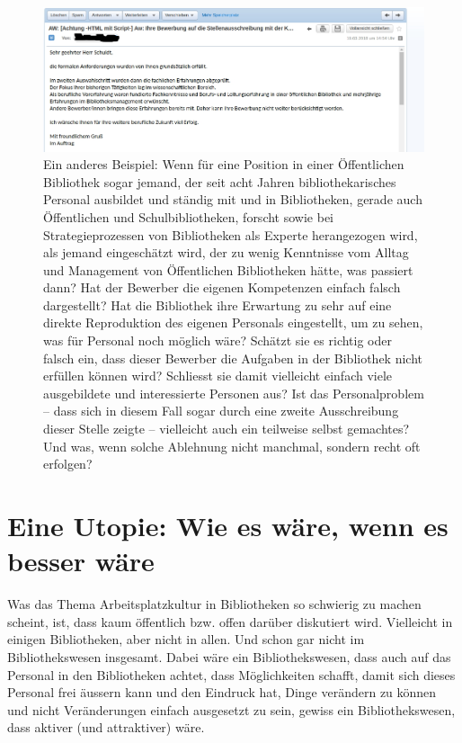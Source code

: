\documentclass[a4paper,
fontsize=11pt,
oneside,
numbers=noperiodatend,
parskip=half-,
bibliography=totoc,
final
]{scrartcl}
\begin{document}
\begin{figure}
\centering
\includegraphics{img/image_2.jpg}
\caption{Ein anderes Beispiel: Wenn für eine Position in einer
Öffentlichen Bibliothek sogar jemand, der seit acht Jahren
bibliothekarisches Personal ausbildet und ständig mit und in
Bibliotheken, gerade auch Öffentlichen und Schulbibliotheken, forscht
sowie bei Strategieprozessen von Bibliotheken als Experte herangezogen
wird, als jemand eingeschätzt wird, der zu wenig Kenntnisse vom Alltag
und Management von Öffentlichen Bibliotheken hätte, was passiert dann?
Hat der Bewerber die eigenen Kompetenzen einfach falsch dargestellt? Hat
die Bibliothek ihre Erwartung zu sehr auf eine direkte Reproduktion des
eigenen Personals eingestellt, um zu sehen, was für Personal noch
möglich wäre? Schätzt sie es richtig oder falsch ein, dass dieser
Bewerber die Aufgaben in der Bibliothek nicht erfüllen können wird?
Schliesst sie damit vielleicht einfach viele ausgebildete und
interessierte Personen aus? Ist das Personalproblem -- dass sich in
diesem Fall sogar durch eine zweite Ausschreibung dieser Stelle zeigte
-- vielleicht auch ein teilweise selbst gemachtes? Und was, wenn solche
Ablehnung nicht manchmal, sondern recht oft erfolgen?}
\end{figure}

\hypertarget{eine-utopie-wie-es-wuxe4re-wenn-es-besser-wuxe4re}{%
\section*{Eine Utopie: Wie es wäre, wenn es besser
wäre}\label{eine-utopie-wie-es-wuxe4re-wenn-es-besser-wuxe4re}}

Was das Thema Arbeitsplatzkultur in Bibliotheken so schwierig zu machen
scheint, ist, dass kaum öffentlich bzw. offen darüber diskutiert wird.
Vielleicht in einigen Bibliotheken, aber nicht in allen. Und schon gar
nicht im Bibliothekswesen insgesamt. Dabei wäre ein Bibliothekswesen,
dass auch auf das Personal in den Bibliotheken achtet, dass
Möglichkeiten schafft, damit sich dieses Personal frei äussern kann und
den Eindruck hat, Dinge verändern zu können und nicht Veränderungen
einfach ausgesetzt zu sein, gewiss ein Bibliothekswesen, dass aktiver
(und attraktiver) wäre.
\end{document}
